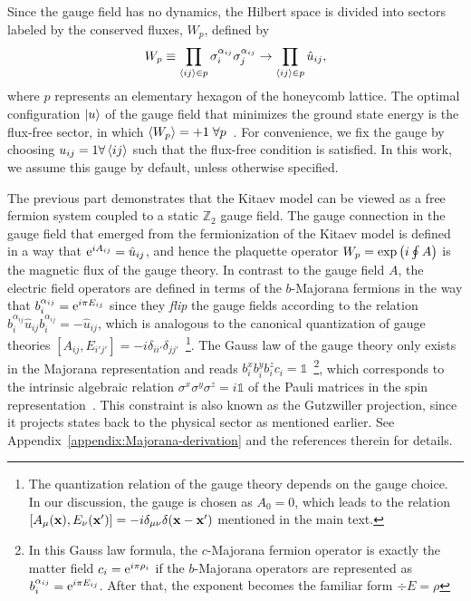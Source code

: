 Since the gauge field has no dynamics, the Hilbert space is divided into sectors labeled by the conserved fluxes, $W_p$, defined by
%
\begin{equation}\label{equ.flux-def}
    W_{p}\equiv \prod_{\left\langle ij \right\rangle\in p}\sigma^{\alpha_{i j}}_{i}\sigma^{\alpha_{i j}}_{j} \to \prod_{\left\langle ij \right\rangle\in p}\hat{u}_{ij},
\end{equation}
where $p$ represents an elementary hexagon of the honeycomb lattice.
%
The optimal configuration $\ket{u}$ of the gauge field that minimizes the ground state energy is the flux-free sector, in which $\left\langle W_p \right\rangle=+1\;\forall p$~\cite{Lieb_1994, Lieb-Loss_1992, Lieb_1992}. For convenience, we fix the gauge by choosing $u_{ij}=1\forall\left\langle ij \right\rangle$ such that the flux-free condition is satisfied. In this work, we assume this gauge by default, unless otherwise specified.




The previous part demonstrates that the Kitaev model can be viewed as a free fermion system coupled to a static $\mathbb{Z}_2$ gauge field.
The gauge connection in the gauge field that emerged from the fermionization of the Kitaev model is defined in a way that $\mathrm{e}^{iA_{ij}} = \hat{u}_{ij}$, and hence the plaquette operator $W_p = \exp\left( i\oint A \right)$ is the magnetic flux of the gauge theory. In contrast to the gauge field $A$, the electric field operators are defined in terms of the $b$-Majorana fermions in the way that $b^{\alpha_{ij}}_i = \mathrm{e}^{i\pi E_{ij}}$ since they \textit{flip} the gauge fields according to the relation $b^{\alpha_{ij}}_i\hat{u}_{ij}b^{\alpha_{ij}}_i = -\hat{u}_{ij}$, which is analogous to the canonical quantization of gauge theories $[A_{ij}, E_{i'j'}] = -i\delta_{ii'}\delta_{jj'}$~\footnote{The quantization relation of the gauge theory depends on the gauge choice. In our discussion, the gauge is chosen as $A_0=0$, which leads to the relation $[A_\mu(\mathbf{x}), E_\nu(\mathbf{x}')] = -i\delta_{\mu\nu}\delta(\mathbf{x}-\mathbf{x}')$ mentioned in the main text.}. The Gauss law of the gauge theory only exists in the Majorana representation and reads
$b^x_ib^y_ib^z_ic_i = \mathds{1}$~\footnote{In this Gauss law formula, the $c$-Majorana fermion operator is exactly the matter field $c_i=\mathrm{e}^{i\pi\rho_i}$ if the $b$-Majorana operators are represented as $b^{\alpha_{ij}}_i=\mathrm{e}^{i\pi E_{ij}}$. After that, the exponent becomes the familiar form $\div{E}=\rho$}, which corresponds to the intrinsic algebraic relation $\sigma^x\sigma^y\sigma^z=i\mathds{1}$ of the Pauli matrices in the spin representation~\cite{Kitaev_2006}. {This constraint is also known as the Gutzwiller projection, since it projects states back to the physical sector as mentioned earlier. See Appendix~\ref{appendix:Majorana-derivation} and the references therein for details.}


